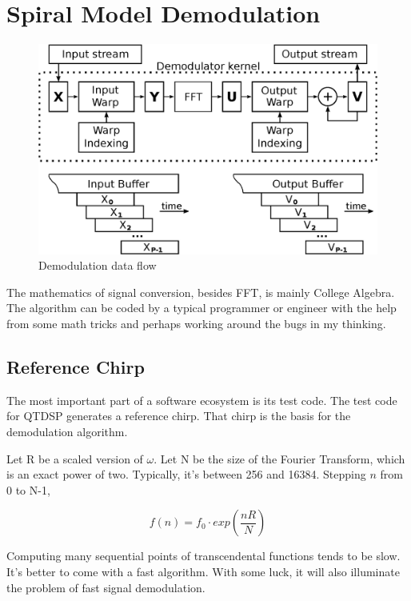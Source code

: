 \section{Spiral Model Demodulation}

\begin{figure}
    \centering
    \includegraphics[width=0.95\linewidth]{../source/demod_e}
    \caption[Quantum to Relative Time Demodulation]{Demodulation data flow}
    \label{fig:demod}
\end{figure}

The mathematics of signal conversion, besides FFT, is mainly College Algebra.
The algorithm can be coded by a typical programmer or engineer with the help
from some math tricks and perhaps working around the bugs in my thinking.

\subsection{Reference Chirp}

The most important part of a software ecosystem is its test code.
The test code for QTDSP generates a reference chirp.
That chirp is the basis for the demodulation algorithm.

Let R be a scaled version of $\omega$.
Let N be the size of the Fourier Transform, which is an exact power of two.
Typically, it's between 256 and 16384. 
Stepping $n$ from 0 to N-1,

\begin{equation}  \label{eq:tc}
f(n) = f_0 \cdot exp\left(\frac{nR}{N}\right)
\end{equation}

Computing many sequential points of transcendental functions tends to be slow.
It's better to come with a fast algorithm. With some luck, it will also illuminate   
the problem of fast signal demodulation.

